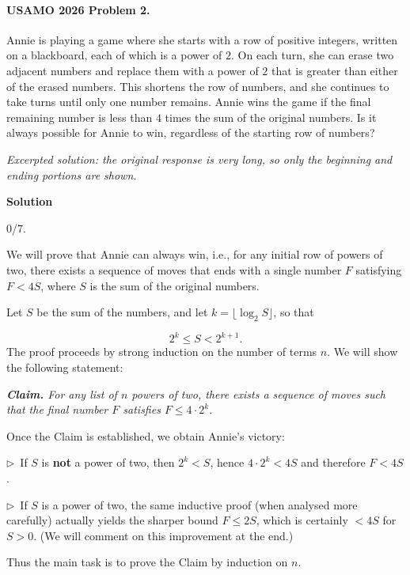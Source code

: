 \documentclass{llmxive}
\providecommand{\solutionheading}[1]{\par\smallskip\noindent\textbf{#1}\par}
\providecommand{\compactbullet}[1]{\par\noindent$\triangleright$~#1\par}
\begin{document}
\paragraph{USAMO 2026 Problem 2.}
\begin{mdframed}[style=mdpurplebox,frametitle={USAMO 2026 Problem 2}]
Annie is playing a game where she starts with a row of positive integers, written on a blackboard, each of which is a power of $2$. On each turn, she can erase two adjacent numbers and replace them with a power of $2$ that is greater than either of the erased numbers. This shortens the row of numbers, and she continues to take turns until only one number remains. Annie wins the game if the final remaining number is less than $4$ times the sum of the original numbers. Is it always possible for Annie to win, regardless of the starting row of numbers?
\end{mdframed}
\par\noindent\textit{Excerpted solution: the original response is very long, so only the beginning and ending portions are shown.}\par
\solutionheading{Solution}
\begin{remark*}
  0/7.
\end{remark*}
We will prove that Annie can always win, i.e., for any initial row of powers of two, there exists a sequence of moves that ends with a single number \(F\) satisfying \(F < 4S\), where \(S\) is the sum of the original numbers.\par
Let \(S\) be the sum of the numbers, and let \(k = \lfloor \log_2 S \rfloor\), so that\par
\[
2^k \le S < 2^{k+1}.
\]
The proof proceeds by strong induction on the number of terms \(n\). We will show the following statement:\par
\par\noindent\emph{\textbf{Claim.}  For any list of \(n\) powers of two, there exists a sequence of moves such that the final number \(F\) satisfies \(F \le 4 \cdot 2^{k}\).}\par
Once the Claim is established, we obtain Annie's victory:\par
\compactbullet{If \(S\) is \textbf{not} a power of two, then \(2^k < S\), hence \(4 \cdot 2^k < 4S\) and therefore \(F < 4S\).}
\compactbullet{If \(S\) is a power of two, the same inductive proof (when analysed more carefully) actually yields the sharper bound \(F \le 2S\), which is certainly \(< 4S\) for \(S>0\).  (We will comment on this improvement at the end.)}
Thus the main task is to prove the Claim by induction on \(n\).\par
\end{document}
